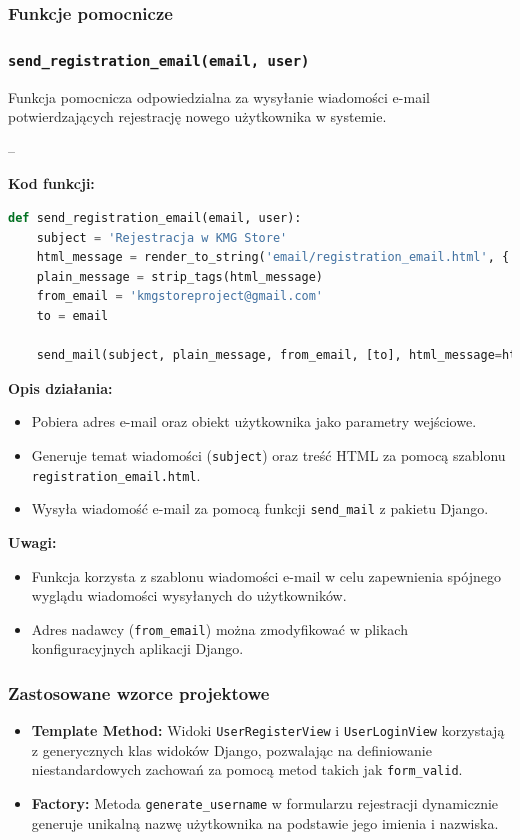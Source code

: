 \documentclass[12pt,a4paper,oneside]{article}
\theoremstyle{definition}
\numberwithin{equation}{section}
\begin{document}
\subsubsection{Funkcje pomocnicze}
\label{sec:helper_functions}

\subsubsection*{\texttt{send\_registration\_email(email, user)}}
Funkcja pomocnicza odpowiedzialna za wysyłanie wiadomości e-mail potwierdzających rejestrację nowego użytkownika w systemie.

--

\textbf{Kod funkcji:}
\begin{lstlisting}[language=Python, caption=Funkcja \texttt{send\_registration_email}]
def send_registration_email(email, user):
    subject = 'Rejestracja w KMG Store'
    html_message = render_to_string('email/registration_email.html', {'user': user})
    plain_message = strip_tags(html_message)
    from_email = 'kmgstoreproject@gmail.com'
    to = email

    send_mail(subject, plain_message, from_email, [to], html_message=html_message)
\end{lstlisting}

\textbf{Opis działania:}
\begin{itemize}
    \item Pobiera adres e-mail oraz obiekt użytkownika jako parametry wejściowe.
    \item Generuje temat wiadomości (\texttt{subject}) oraz treść HTML za pomocą szablonu \texttt{registration\_email.html}.
    \item Wysyła wiadomość e-mail za pomocą funkcji \texttt{send\_mail} z pakietu Django.
\end{itemize}

\textbf{Uwagi:}
\begin{itemize}
    \item Funkcja korzysta z szablonu wiadomości e-mail w celu zapewnienia spójnego wyglądu wiadomości wysyłanych do użytkowników.
    \item Adres nadawcy (\texttt{from\_email}) można zmodyfikować w plikach konfiguracyjnych aplikacji Django.
\end{itemize}

\subsubsection*{Zastosowane wzorce projektowe}
\begin{itemize}
    \item \textbf{Template Method:} Widoki \texttt{UserRegisterView} i \texttt{UserLoginView} korzystają z generycznych klas widoków Django, pozwalając na definiowanie niestandardowych zachowań za pomocą metod takich jak \texttt{form\_valid}.
    \item \textbf{Factory:} Metoda \texttt{generate\_username} w formularzu rejestracji dynamicznie generuje unikalną nazwę użytkownika na podstawie jego imienia i nazwiska.
\end{itemize}
\end{document}
